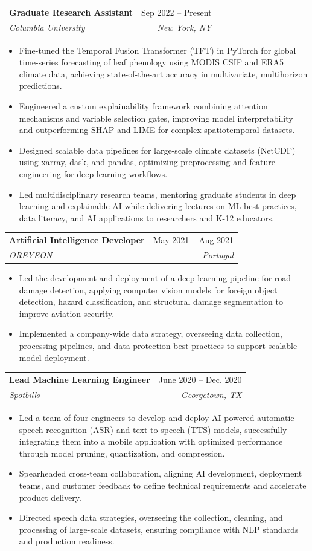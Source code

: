 \documentclass[letterpaper,11pt]{article}
\makeatletter
\newcommand{\resumeItem}[1]{
  \item\small{
    {#1 \vspace{-2pt}}
  }
}
\newcommand{\resumeSubheading}[4]{
  \vspace{-2pt}\item
    \begin{tabular*}{0.97\textwidth}[t]{l@{\extracolsep{\fill}}r}
      \textbf{#1} & #2 \\
      \textit{\small#3} & \textit{\small #4} \\
    \end{tabular*}\vspace{-7pt}
}
\newcommand{\resumeSubSubheading}[2]{
    \item
    \begin{tabular*}{0.97\textwidth}{l@{\extracolsep{\fill}}r}
      \textit{\small#1} & \textit{\small #2} \\
    \end{tabular*}\vspace{-7pt}
}
\newcommand{\resumeSubHeadingListEnd}{\end{itemize}}
\newcommand{\resumeItemListStart}{\begin{itemize}}
\newcommand{\resumeItemListEnd}{\end{itemize}\vspace{-5pt}}
\makeatother
\begin{document}
    \resumeSubheading
      {Graduate Research Assistant}{Sep 2022 -- Present}
      {Columbia University}{New York, NY}
      \resumeItemListStart
        \resumeItem{Fine-tuned the Temporal Fusion Transformer (TFT) in PyTorch for global time-series forecasting of leaf phenology using MODIS CSIF and ERA5 climate data, achieving state-of-the-art accuracy in multivariate, multihorizon predictions.}
        \resumeItem{Engineered a custom explainability framework combining attention mechanisms and variable selection gates, improving model interpretability and outperforming SHAP and LIME for complex spatiotemporal datasets.}
        \resumeItem{Designed scalable data pipelines for large-scale climate datasets (NetCDF) using xarray, dask, and pandas, optimizing preprocessing and feature engineering for deep learning workflows.}
        \resumeItem{Led multidisciplinary research teams, mentoring graduate students in deep learning and explainable AI while delivering lectures on ML best practices, data literacy, and AI applications to researchers and K-12 educators.}
      \resumeItemListEnd
      


    \resumeSubheading
      {Artificial Intelligence Developer}{May 2021 -- Aug 2021}
      {OREYEON}{Portugal}
      \resumeItemListStart
        \resumeItem{Led the development and deployment of a deep learning pipeline for road damage detection, applying computer vision models for foreign object detection, hazard classification, and structural damage segmentation to improve aviation security.}
        \resumeItem{Implemented a company-wide data strategy, overseeing data collection, processing pipelines, and data protection best practices to support scalable model deployment.}
      \resumeItemListEnd

    \resumeSubheading
      {Lead Machine Learning Engineer}{June 2020 -- Dec. 2020}
      {Spotbills}{Georgetown, TX}
      \resumeItemListStart
        \resumeItem{Led a team of four engineers to develop and deploy AI-powered automatic speech recognition (ASR) and text-to-speech (TTS) models, successfully integrating them into a mobile application with optimized performance through model pruning, quantization, and compression.}
        \resumeItem{Spearheaded cross-team collaboration, aligning AI development, deployment teams, and customer feedback to define technical requirements and accelerate product delivery.}
        \resumeItem{Directed speech data strategies, overseeing the collection, cleaning, and processing of large-scale datasets, ensuring compliance with NLP standards and production readiness.}
    \resumeItemListEnd
\end{document}
